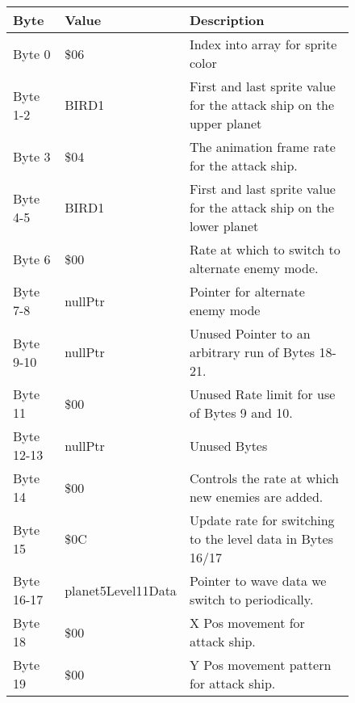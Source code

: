 \begin{figure}[H]
  {
  \setlength{\tabcolsep}{3.0pt}
  \setlength\cmidrulewidth{\heavyrulewidth} %
  \begin{adjustbox}{width=12cm}

\begin{tabular}{lll}
\toprule
 Byte       & Value                      & Description                                                         \\
\midrule
 Byte 0     & \$06                        & Index into array for sprite color                                   \\
 Byte 1-2   & BIRD1                      & First and last sprite value for the attack ship on the upper planet \\
 Byte 3     & \$04                        & The animation frame rate for the attack ship.                       \\
 Byte 4-5   & BIRD1                      & First and last sprite value for the attack ship on the lower planet \\
 Byte 6     & \$00                        & Rate at which to switch to alternate enemy mode.                    \\
 Byte 7-8   & nullPtr                    & Pointer for alternate enemy mode                                    \\
 Byte 9-10  & nullPtr                    & Unused Pointer to an arbitrary run of Bytes 18-21.                  \\
 Byte 11    & \$00                        & Unused Rate limit for use of Bytes 9 and 10.                        \\
 Byte 12-13 & nullPtr                    & Unused Bytes                                                        \\
 Byte 14    & \$00                        & Controls the rate at which new enemies are added.                   \\
 Byte 15    & \$0C                        & Update rate for switching to the level data in Bytes 16/17          \\
 Byte 16-17 & planet5Level11Data         & Pointer to wave data we switch to periodically.                     \\
 Byte 18    & \$00                        & X Pos movement for attack ship.                                     \\
 Byte 19    & \$00                        & Y Pos movement pattern for attack ship.                             \\

\end{tabular}
\end{adjustbox}}
\end{figure}
